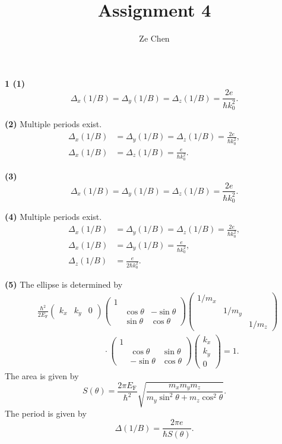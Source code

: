 \documentclass{article}
\title{Assignment 4}
\author{Ze Chen}
\makeatletter
\newcommand*{\shifttext}[1]{%
  \settowidth{\@tempdima}{#1}%
  \hspace{-\@tempdima}#1%
}
\newcommand{\plabel}[1]{%
\shifttext{\textbf{#1}\quad}%
}
\newcommand{\minusbaseline}{\abovedisplayskip=0pt\abovedisplayshortskip=0pt~\vspace*{-\baselineskip}}%
\makeatother
\begin{document}
\maketitle

\plabel{1 (1)}%
\begingroup\minusbaseline%
\[ \Delta_x(1/B) = \Delta_y(1/B) = \Delta_z(1/B) = \frac{2e}{\hbar k_0^2}. \]
\endgroup

\plabel{(2)}%
Multiple periods exist.
\begin{align*}
    \Delta_x(1/B) &= \Delta_y(1/B) = \Delta_z(1/B) = \frac{2e}{\hbar k_0^2}, \\
    \Delta_x(1/B) &= \Delta_z(1/B) = \frac{e}{\hbar k_0^2}.
\end{align*}

\plabel{(3)}%
\begingroup\minusbaseline%
\[ \Delta_x(1/B) = \Delta_y(1/B) = \Delta_z(1/B) = \frac{2 e}{\hbar k_0^2}. \]
\endgroup

\plabel{(4)}%
Multiple periods exist.
\begin{align*}
    \Delta_x(1/B) &= \Delta_y(1/B) = \Delta_z(1/B) = \frac{2 e}{\hbar k_0^2}, \\
    \Delta_x(1/B) &= \Delta_y(1/B) = \frac{e}{\hbar k_0^2}, \\
    \Delta_z(1/B) &= \frac{e}{2\hbar k_0^2}.
\end{align*}

\plabel{(5)}%
The ellipse is determined by
\begin{align*}
    & \frac{\hbar^2}{2E_{\mathrm{F}}} \begin{pmatrix}
        k_x & k_y & 0
    \end{pmatrix} \begin{pmatrix}
        1 & & \\
        & \cos\theta & -\sin\theta \\
        & \sin\theta & \cos\theta
    \end{pmatrix}\begin{pmatrix}
        1/m_x & & \\
        & 1/m_y & \\
        & & 1/m_z
    \end{pmatrix} \\
    & \hspace{8em} \cdot \begin{pmatrix}
        1 & & \\
        & \cos\theta & \sin\theta \\
        & -\sin\theta & \cos\theta
    \end{pmatrix} \begin{pmatrix}
        k_x \\ k_y \\ 0
    \end{pmatrix} = 1.
\end{align*}
The area is given by
\[ S(\theta) = \frac{2\pi E_{\mathrm{F}}}{\hbar^2} \sqrt{\frac{m_x m_y m_z}{m_y \sin^2\theta + m_z \cos^2\theta}}. \]
The period is given by
\[ \Delta(1/B) = \frac{2\pi e}{\hbar S(\theta)}. \]
\end{document}
